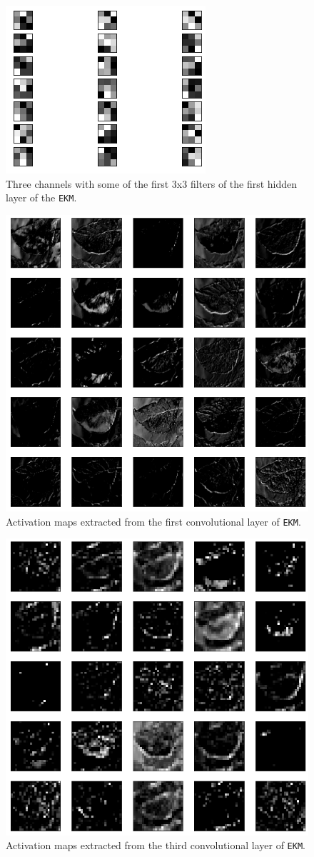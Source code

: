 \documentclass[aps,twocolumn,secnumarabic,nobalancelastpage,amsmath,amssymb,
nofootinbib]{revtex4}
\begin{document}
\begin{figure}[h!]
	\centering
	\includegraphics[width=0.6\linewidth]{Images/FiltersEKM}
	\caption{Three channels with some of the first 3x3 filters of the first hidden layer of the \texttt{EKM}.}
	\label{fig:filtersekm}
\end{figure}
\begin{figure}[h!]
	\centering
	\includegraphics[width=0.6\linewidth]{Images/FeatureMaps9}
	
	\caption{Activation maps extracted from the first convolutional layer of \texttt{EKM}.}
	\label{fig:fm9}
\end{figure}
\begin{figure}[h!]
	\centering
	\includegraphics[width=0.6\linewidth]{Images/FeatureMaps6}
	
	\caption{Activation maps extracted from the third convolutional layer of \texttt{EKM}.}
	\label{fig:fm6}
\end{figure}
\end{document}
